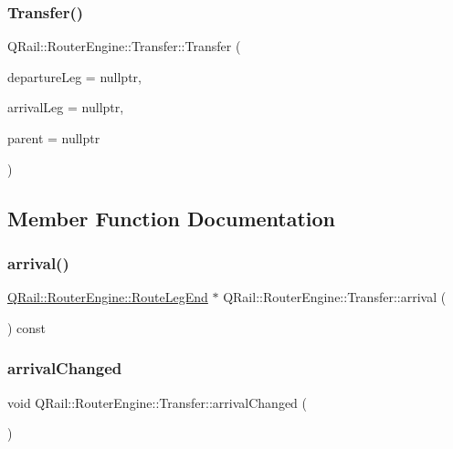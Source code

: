 \subsubsection{\texorpdfstring{Transfer()}{Transfer()}}
{\footnotesize\ttfamily Q\+Rail\+::\+Router\+Engine\+::\+Transfer\+::\+Transfer (\begin{DoxyParamCaption}\item[{\mbox{\hyperlink{classQRail_1_1RouterEngine_1_1RouteLeg}{Q\+Rail\+::\+Router\+Engine\+::\+Route\+Leg}} $\ast$}]{departure\+Leg = {\ttfamily nullptr},  }\item[{\mbox{\hyperlink{classQRail_1_1RouterEngine_1_1RouteLeg}{Q\+Rail\+::\+Router\+Engine\+::\+Route\+Leg}} $\ast$}]{arrival\+Leg = {\ttfamily nullptr},  }\item[{Q\+Object $\ast$}]{parent = {\ttfamily nullptr} }\end{DoxyParamCaption})\hspace{0.3cm}{\ttfamily [explicit]}}



\subsection{Member Function Documentation}
\mbox{\label{classQRail_1_1RouterEngine_1_1Transfer_aba50a1ebdec084c649ccf4fe227d13ba}} 
\subsubsection{\texorpdfstring{arrival()}{arrival()}}
{\footnotesize\ttfamily \mbox{\hyperlink{classQRail_1_1RouterEngine_1_1RouteLegEnd}{Q\+Rail\+::\+Router\+Engine\+::\+Route\+Leg\+End}} $\ast$ Q\+Rail\+::\+Router\+Engine\+::\+Transfer\+::arrival (\begin{DoxyParamCaption}{ }\end{DoxyParamCaption}) const}

\mbox{\label{classQRail_1_1RouterEngine_1_1Transfer_a8d8d0e3c03ff32d921f672da6a4856d4}} 
\subsubsection{\texorpdfstring{arrivalChanged}{arrivalChanged}}
{\footnotesize\ttfamily void Q\+Rail\+::\+Router\+Engine\+::\+Transfer\+::arrival\+Changed (\begin{DoxyParamCaption}{ }\end{DoxyParamCaption})\hspace{0.3cm}{\ttfamily [signal]}}

